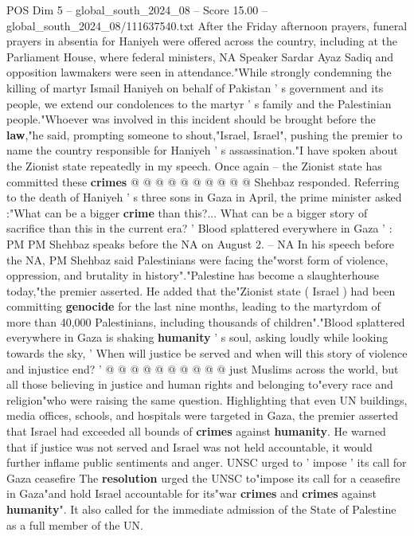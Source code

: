 \begin{textsample}{POS Dim 5 – global\_south\_2024\_08 – Score 15.00 – global\_south\_2024\_08/111637540.txt}
After the Friday afternoon prayers, funeral prayers in absentia for Haniyeh were offered across the country, including at the Parliament House, where federal ministers, NA Speaker Sardar Ayaz Sadiq and opposition lawmakers were seen in attendance."While strongly condemning the killing of martyr Ismail Haniyeh on behalf of Pakistan ' s government and its people, we extend our condolences to the martyr ' s family and the Palestinian people."Whoever was involved in this incident should be brought before the \textbf{law},"he said, prompting someone to shout,"Israel, Israel", pushing the premier to name the country responsible for Haniyeh ' s assassination."I have spoken about the Zionist state repeatedly in my speech.
Once again -- the Zionist state has committed these \textbf{crimes} @ @ @ @ @ @ @ @ @ @ Shehbaz responded.
Referring to the death of Haniyeh ' s three sons in Gaza in April, the prime minister asked :"What can be a bigger \textbf{crime} than this?...
What can be a bigger story of sacrifice than this in the current era? ' Blood splattered everywhere in Gaza ' : PM PM Shehbaz speaks before the NA on August 2. -- NA In his speech before the NA, PM Shehbaz said Palestinians were facing the"worst form of violence, oppression, and brutality in history"."Palestine has become a slaughterhouse today,"the premier asserted.
He added that the"Zionist state ( Israel ) had been committing \textbf{genocide} for the last nine months, leading to the martyrdom of more than 40,000 Palestinians, including thousands of children"."Blood splattered everywhere in Gaza is shaking \textbf{humanity} ' s soul, asking loudly while looking towards the sky, ' When will justice be served and when will this story of violence and injustice end? ' @ @ @ @ @ @ @ @ @ @ just Muslims across the world, but all those believing in justice and human rights and belonging to"every race and religion"who were raising the same question.
Highlighting that even UN buildings, media offices, schools, and hospitals were targeted in Gaza, the premier asserted that Israel had exceeded all bounds of \textbf{crimes} against \textbf{humanity}.
He warned that if justice was not served and Israel was not held accountable, it would further inflame public sentiments and anger.
UNSC urged to ' impose ' its call for Gaza ceasefire The \textbf{resolution} urged the UNSC to"impose its call for a ceasefire in Gaza"and hold Israel accountable for its"war \textbf{crimes} and \textbf{crimes} against \textbf{humanity}".
It also called for the immediate admission of the State of Palestine as a full member of the UN.

\end{textsample}
